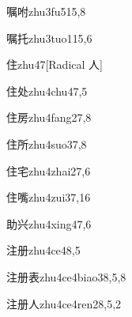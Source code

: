 \begin{verbete}{嘱咐}{zhu3fu5}{15,8}
\end{verbete}

\begin{verbete}{嘱托}{zhu3tuo1}{15,6}
\end{verbete}

\begin{verbete}{住}{zhu4}{7}[Radical 人]
\end{verbete}

\begin{verbete}{住处}{zhu4chu4}{7,5}
\end{verbete}

\begin{verbete}{住房}{zhu4fang2}{7,8}
\end{verbete}

\begin{verbete}{住所}{zhu4suo3}{7,8}
\end{verbete}

\begin{verbete}{住宅}{zhu4zhai2}{7,6}
\end{verbete}

\begin{verbete}{住嘴}{zhu4zui3}{7,16}
\end{verbete}

\begin{verbete}{助兴}{zhu4xing4}{7,6}
\end{verbete}

\begin{verbete}{注册}{zhu4ce4}{8,5}
\end{verbete}

\begin{verbete}{注册表}{zhu4ce4biao3}{8,5,8}
\end{verbete}

\begin{verbete}{注册人}{zhu4ce4ren2}{8,5,2}
\end{verbete}

